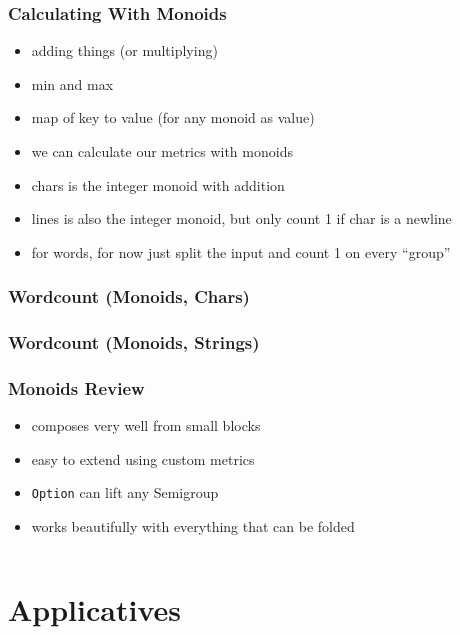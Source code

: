 \documentclass[aspectratio=169]{beamer}
\begin{document}
\begin{frame}
  \frametitle{Calculating With Monoids}
  \begin{itemize}
  \item adding things (or multiplying)
  \item min and max
  \item map of key to value (for any monoid as value)
  \item we can calculate our metrics with monoids
  \item chars is the integer monoid with addition
  \item lines is also the integer monoid, but only count 1 if char is a newline
  \item for words, for now just split the input and count 1 on every ``group''
  \end{itemize}
\end{frame}

\begin{frame}[fragile]
  \frametitle{Wordcount (Monoids, Chars)}
\end{frame}

\begin{frame}[fragile]
  \frametitle{Wordcount (Monoids, Strings)}
\end{frame}

\begin{frame}
  \frametitle{Monoids \textemdash{} Review}
  \begin{itemize}
  \item composes very well from small blocks
  \item easy to extend using custom metrics
  \item \texttt{Option} can lift any Semigroup
  \item works beautifully with everything that can be folded
  \end{itemize}
  \vspace{1cm}
  \inputminted[fontsize=\small]{scala}{snippets/foldable-def.scala}
\end{frame}

\section{Applicatives}\label{sec:applicatives}
\end{document}
